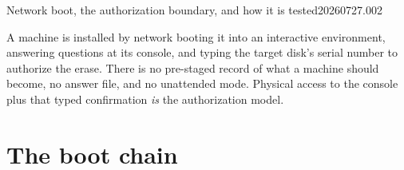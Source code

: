 


  {Network boot, the authorization boundary, and how it is tested}{20260727.002}



A machine is installed by network booting it into an interactive environment,
answering questions at its console, and typing the target disk's serial number
to authorize the erase. There is no pre-staged record of what a machine should
become, no answer file, and no unattended mode. Physical access to the console
plus that typed confirmation \emph{is} the authorization model.

\section{The boot chain}
